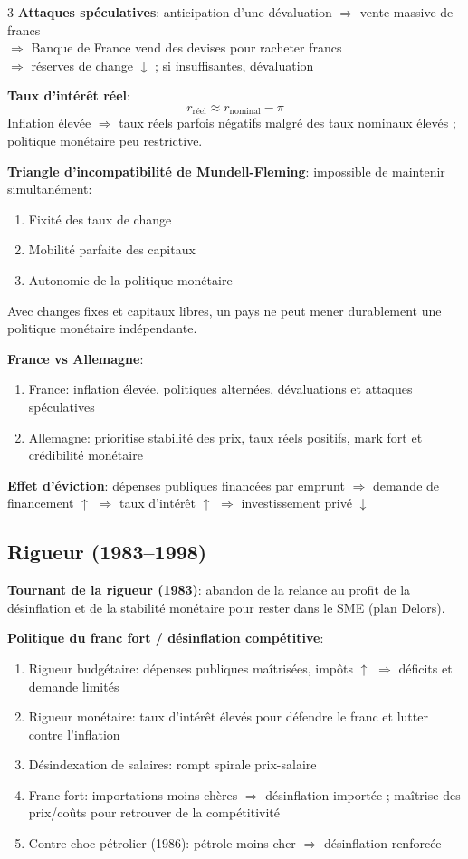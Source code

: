 \documentclass[12pt, a4paper]{article}
\begin{document}
\begin{multicols*}{3}
\textbf{Attaques spéculatives}: anticipation d'une dévaluation $\Rightarrow$ vente massive de francs \\$\Rightarrow$ Banque de France vend des devises pour racheter francs \\$\Rightarrow$ réserves de change $\downarrow$ ; si insuffisantes, dévaluation

\textbf{Taux d'intérêt réel}:
\[
\boxed{r_{\text{réel}}\approx r_{\text{nominal}}-\pi}
\]
Inflation élevée $\Rightarrow$ taux réels parfois négatifs malgré des taux nominaux élevés ; politique monétaire peu restrictive.

\textbf{Triangle d'incompatibilité de Mundell-Fleming}: impossible de maintenir simultanément:
\begin{enumerate}[\roman*.]
  \item Fixité des taux de change
  \item Mobilité parfaite des capitaux
  \item Autonomie de la politique monétaire
\end{enumerate}
Avec changes fixes et capitaux libres, un pays ne peut mener durablement une politique monétaire indépendante.

\colbreak
\textbf{France vs Allemagne}:
\begin{enumerate}[\roman*.]
  \item France: inflation élevée, politiques alternées, dévaluations et attaques spéculatives
  \item Allemagne: prioritise stabilité des prix, taux réels positifs, mark fort et crédibilité monétaire
\end{enumerate}

\textbf{Effet d'éviction}: dépenses publiques financées par emprunt $\Rightarrow$ demande de financement $\uparrow$ $\Rightarrow$ taux d'intérêt $\uparrow$ $\Rightarrow$ investissement privé $\downarrow$ 

\subsection{Rigueur (1983--1998)}

\textbf{Tournant de la rigueur (1983)}: abandon de la relance au profit de la désinflation et de la stabilité monétaire pour rester dans le SME (plan Delors).

\textbf{Politique du franc fort / désinflation compétitive}:
\begin{enumerate}[\roman*.]
  \item Rigueur budgétaire: dépenses publiques maîtrisées, impôts $\uparrow$ $\Rightarrow$ déficits et demande limités
  \item Rigueur monétaire: taux d'intérêt élevés pour défendre le franc et lutter contre l'inflation
  \item Désindexation de salaires: rompt spirale prix-salaire
  \item Franc fort: importations moins chères $\Rightarrow$ désinflation importée ; maîtrise des prix/coûts pour retrouver de la compétitivité
  \item Contre-choc pétrolier (1986): pétrole moins cher $\Rightarrow$ désinflation renforcée
\end{enumerate}


\end{multicols*}
\end{document}
